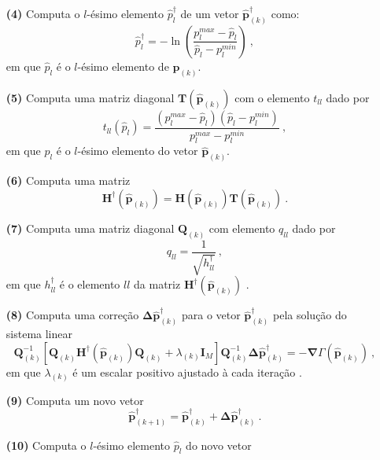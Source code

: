 \begin{itemize}
	\item[\textbf{(4)}] Computa o $l$-ésimo elemento $\hat{p}^{\dagger}_{l}$ de um vetor $\hat{\mathbf{p}}^{\dagger}_{(k)}$ como:
	$$
	\hat{p}^{\dagger}_{l} = -\ln\left(\frac{p_{l}^{max} - \hat{p}_{l}}{\hat{p}_{l} - p_{l}^{min}}\right) \: ,
	$$
	em que $\hat{p}_{l}$ é o $l$-ésimo elemento de $\hat{\mathbf{p}}_{(k)}$.
	\item[\textbf{(5)}] Computa uma matriz diagonal $\mathbf{T}(\hat{\mathbf{p}}_{(k)})$ 
	com o elemento $t_{ll}$ dado por
	$$
	t_{ll}(\hat{p}_{l}) = \frac{(p_{l}^{max} - \hat{p}_{l})(\hat{p}_{l} - p_{l}^{min})}{p_{l}^{max} - p_{l}^{min}} \: ,
	$$
	em que $p_{l}$ é o $l$-ésimo elemento do vetor $\hat{\mathbf{p}}_{(k)}$.
	\item[\textbf{(6)}] Computa uma matriz 
	$$
	\mathbf{H}^{\dagger}(\hat{\mathbf{p}}_{(k)}) = \mathbf{H}(\hat{\mathbf{p}}_{(k)})\mathbf{T}(\hat{\mathbf{p}}_{(k)}) \: .
	$$
	\item[\textbf{(7)}] Computa uma matriz diagonal $\mathbf{Q}_{(k)}$ com elemento $q_{ll}$ dado por 
	$$
	q_{ll} = \frac{1}{\sqrt{h^{\dagger}_{ll}}} \: ,
	$$
	em que $h^{\dagger}_{ll}$ é o elemento $ll$ da matriz $\mathbf{H}^{\dagger}(\hat{\mathbf{p}}_{(k)})$ .
	\item[\textbf{(8)}] Computa uma correção 
	$\boldsymbol{\Delta}\hat{\mathbf{p}}^{\dagger}_{(k)}$ para o vetor 
	$\hat{\mathbf{p}}^{\dagger}_{(k)}$ pela solução do sistema linear
	$$
	\mathbf{Q}_{(k)}^{-1} \left[ \mathbf{Q}_{(k)} 
	\mathbf{H}^{\dagger}(\hat{\mathbf{p}}_{(k)}) \mathbf{Q}_{(k)} + 
	\lambda_{(k)} \mathbf{I}_{M} \right] \mathbf{Q}_{(k)}^{-1}
	\boldsymbol{\Delta} \hat{\mathbf{p}}^{\dagger}_{(k)} = 
	- \boldsymbol{\nabla}\Gamma(\hat{\mathbf{p}}_{(k)}) \: ,
	$$
	em que $\lambda_{(k)}$ é um escalar positivo ajustado à cada iteração
	\citep[por exemplo,][p. 624]{seber_wild2003}.
	\item[\textbf{(9)}] Computa um novo vetor 
	$$
	\hat{\mathbf{p}}^{\dagger}_{(k+1)} = \hat{\mathbf{p}}^{\dagger}_{(k)} + \boldsymbol{\Delta}\hat{\mathbf{p}}^{\dagger}_{(k)} \: .
	$$
	\item[\textbf{(10)}] Computa o $l$-ésimo elemento $ \hat{p}_{l} $ do novo vetor

\end{itemize}
